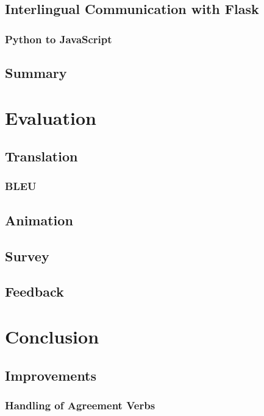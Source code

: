 \documentclass[12pt]{ociamthesis}  %
\begin{document}
\section{Interlingual Communication with Flask}
	\subsection{Python to JavaScript}

\section{Summary}
			

\chapter{Evaluation}

\section{Translation}
	\subsection{BLEU}
\section{Animation}
\section{Survey}
\section{Feedback}


\chapter{Conclusion}

\section{Improvements}
	\subsection{Handling of Agreement Verbs}
\end{document}

